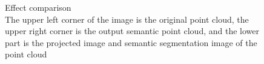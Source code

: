 \documentclass{article}
\begin{document}
\begin{normalsize}
          \begin{figure}[htbp]
          \centering
          \quad
          \quad
          \quad
          \caption{Effect comparison\\The upper left corner of the image is the original point cloud, the upper right corner is the output semantic point cloud, and the lower part is the projected image and semantic segmentation image of the point cloud}
        \end{figure}
        

\end{normalsize}
\end{document}
